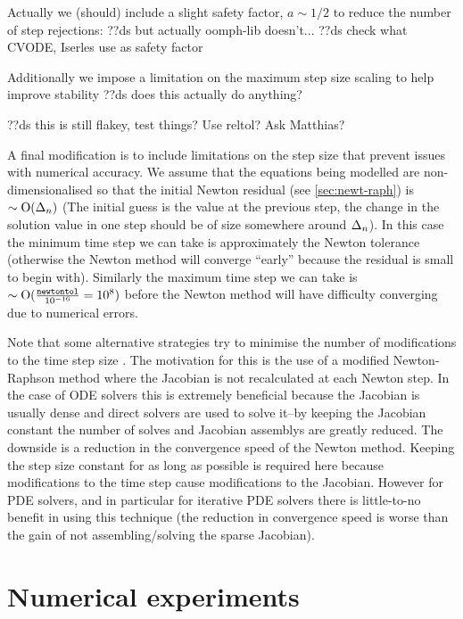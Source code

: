 Actually we (should) include a slight safety factor, $a \sim 1/2$ to reduce the number of step rejections:
??ds but actually oomph-lib doesn't...
??ds check what CVODE, Iserles use as safety factor


Additionally we impose a limitation on the maximum step size scaling to help improve stability ??ds does this actually do anything?


??ds this is still flakey, test things? Use reltol? Ask Matthias?

A final modification is to include limitations on the step size that prevent issues with numerical accuracy.
We assume that the equations being modelled are non-dimensionalised so that the initial Newton residual (see \autoref{sec:newt-raph}) is $\sim \text{O}(\Delta_{n})$ (The initial guess is the value at the previous step, the change in the solution value in one step should be of size somewhere around $\Delta_{n}$).
In this case the minimum time step we can take is approximately the Newton tolerance (otherwise the Newton method will converge ``early'' because the residual is small to begin with).
Similarly the maximum time step we can take is $\sim \text{O}(\frac{\texttt{newtontol}}{10^{-16}} = 10^{8})$ before the Newton method will have difficulty converging due to numerical errors.


Note that some alternative strategies try to minimise the number of modifications to the time step size \cite[chap. 6]{Iserles2009} \cite[Sec. 2.1]{cvode-manual}.
The motivation for this is the use of a modified Newton-Raphson method where the Jacobian is not recalculated at each Newton step.
In the case of ODE solvers this is extremely beneficial because the Jacobian is usually dense and direct solvers are used to solve it--by keeping the Jacobian constant the number of solves and Jacobian assemblys are greatly reduced.
The downside is a reduction in the convergence speed of the Newton method.
Keeping the step size constant for as long as possible is required here because modifications to the time step cause modifications to the Jacobian.
However for PDE solvers, and in particular for iterative PDE solvers there is little-to-no benefit in using this technique (the reduction in convergence speed is worse than the gain of not assembling/solving the sparse Jacobian)\cite[pg. 128]{Iserles2009}.


\section{Numerical experiments}
\label{sec:aimr-testing}


